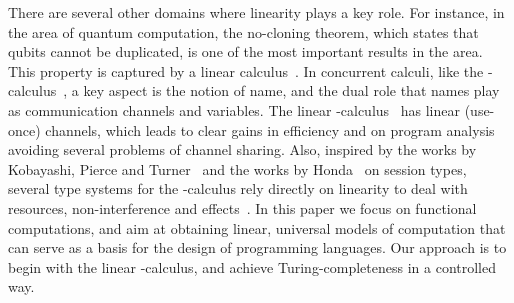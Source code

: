 \documentclass{article}
\begin{document}
There are several other domains where linearity plays a key role.  For
instance, in the area of quantum computation, the no-cloning theorem,
which states that qubits cannot be duplicated, is one of the most
important results in the area. This property is captured by a linear
calculus~\cite{Tonder2004}. In concurrent calculi, like the
-calculus~\cite{Milner1992}, a key aspect is the notion of name,
and the dual role that names play as communication channels and
variables. The linear -calculus~\cite{KobayashiPT96} has linear
(use-once) channels, which leads to clear gains in efficiency and on
program analysis avoiding several problems of channel sharing. Also,
inspired by the works by Kobayashi, Pierce and
Turner~\cite{KobayashiPT96} and the works by Honda~\cite{Honda93} on
session types, several type systems for the -calculus rely
directly on linearity to deal with resources, non-interference and
effects~\cite{GiuntiV10,YoshidaHB02}.  In this paper we focus on
functional computations, and aim at obtaining linear, universal models
of computation that can serve as a basis for the design of programming
languages. Our approach is to begin with the linear
-calculus, and achieve Turing-completeness in a controlled
way.  
\end{document}
